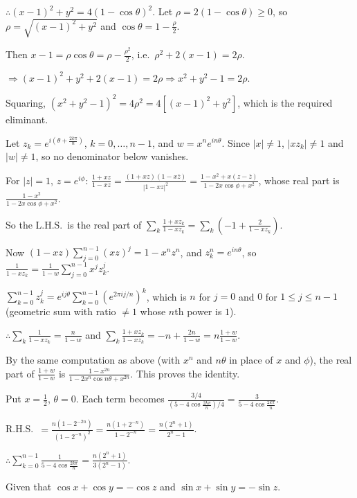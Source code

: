   $\therefore (x - 1)^2 + y^2 = 4(1 - \cos\theta)^2$. Let $\rho = 2(1 - \cos\theta)\geq 0$, so $\rho = \sqrt{(x -
    1)^2 + y^2}$ and $\cos\theta = 1 - \frac{\rho}{2}$.

  Then $x - 1 = \rho\cos\theta = \rho - \frac{\rho^2}{2}$, i.e.\ $\rho^2 + 2(x - 1) = 2\rho$.

  $\Rightarrow (x - 1)^2 + y^2 + 2(x - 1) = 2\rho\Rightarrow x^2 + y^2 - 1 = 2\rho$.

  Squaring, $(x^2 + y^2 - 1)^2 = 4\rho^2 = 4\left[(x - 1)^2 + y^2\right]$, which is the required eliminant.
\item Let $z_k = e^{i\left(\theta + \frac{2k\pi}{n}\right)}$, $k = 0, \ldots, n - 1$, and $w = x^ne^{in\theta}$.
  Since $|x|\neq 1$, $|xz_k|\neq 1$ and $|w|\neq 1$, so no denominator below vanishes.

  For $|z| = 1$, $z = e^{i\phi}$: $\frac{1 + xz}{1 - xz} = \frac{(1 + xz)(1 - x\bar z)}{|1 - xz|^2} = \frac{1 - x^2 +
    x(z - \bar z)}{1 - 2x\cos\phi + x^2}$, whose real part is $\frac{1 - x^2}{1 - 2x\cos\phi + x^2}$.

  So the L.H.S.\ is the real part of $\displaystyle\sum_k\frac{1 + xz_k}{1 - xz_k} = \sum_k\left(-1 + \frac{2}{1 -
    xz_k}\right)$.

  Now $(1 - xz)\displaystyle\sum_{j = 0}^{n - 1}(xz)^j = 1 - x^nz^n$, and $z_k^n = e^{in\theta}$, so $\frac{1}{1 -
    xz_k} = \frac{1}{1 - w}\displaystyle\sum_{j = 0}^{n - 1}x^jz_k^j$.

  $\displaystyle\sum_{k = 0}^{n - 1}z_k^j = e^{ij\theta}\sum_{k = 0}^{n - 1}\left(e^{2\pi ij/n}\right)^k$, which is $n$
  for $j = 0$ and $0$ for $1\leq j\leq n - 1$ (geometric sum with ratio $\neq 1$ whose $n$th power is $1$).

  $\therefore \displaystyle\sum_k\frac{1}{1 - xz_k} = \frac{n}{1 - w}$ and $\sum_k\frac{1 + xz_k}{1 - xz_k} = -n +
  \frac{2n}{1 - w} = n\frac{1 + w}{1 - w}$.

  By the same computation as above (with $x^n$ and $n\theta$ in place of $x$ and $\phi$), the real part of $\frac{1
    + w}{1 - w}$ is $\frac{1 - x^{2n}}{1 - 2x^n\cos n\theta + x^{2n}}$. This proves the identity.

  Put $x = \frac{1}{2}$, $\theta = 0$. Each term becomes $\frac{3/4}{(5 - 4\cos\frac{2k\pi}{n})/4} = \frac{3}{5 -
    4\cos\frac{2k\pi}{n}}$.

  R.H.S.\ $= \frac{n(1 - 2^{-2n})}{(1 - 2^{-n})^2} = \frac{n(1 + 2^{-n})}{1 - 2^{-n}} = \frac{n(2^n + 1)}{2^n - 1}$.

  $\therefore \displaystyle\sum_{k = 0}^{n - 1}\frac{1}{5 - 4\cos\frac{2k\pi}{n}} = \frac{n(2^n + 1)}{3(2^n - 1)}$.
\item Given that $\cos x + \cos y = -\cos z$ and $\sin x + \sin y = -\sin z$.

